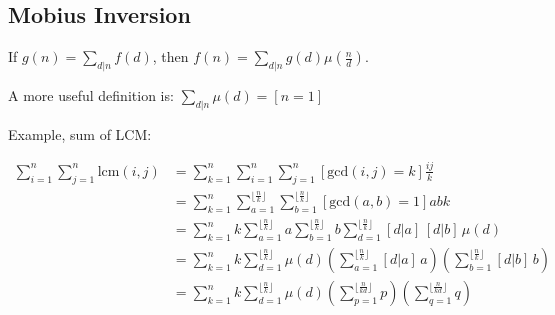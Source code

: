 \subsection{Mobius Inversion}

If $g(n) = \sum_{d|n} f(d)$, then $f(n) = \sum_{d|n} g(d) \mu(\frac{n}{d})$.

A more useful definition is: $\sum_{d|n} \mu(d) = [n = 1]$

Example, sum of LCM:

\begin{align*}
    \sum_{i = 1}^n \sum_{j = 1}^n \text{lcm}(i, j) &=
    \sum_{k = 1}^n\sum_{i=1}^n\sum_{j=1}^n [\text{gcd}(i, j) = k] \frac{ij}{k} \\
    &= \sum_{k = 1}^n\sum_{a=1}^{\lfloor \frac{n}{k} \rfloor}\sum_{b=1}^{\lfloor \frac{n}{k} \rfloor} [\text{gcd}(a, b) = 1] abk \\
    &= \sum_{k = 1}^n k \sum_{a=1}^{\lfloor \frac{n}{k} \rfloor} a \sum_{b=1}^{\lfloor \frac{n}{k} \rfloor} b \sum_{d=1}^{\lfloor \frac{n}{k} \rfloor}[d|a]\,[d|b] \, \mu(d) \\
    &= \sum_{k = 1}^n k \sum_{d=1}^{\lfloor \frac{n}{k} \rfloor}  \mu(d) \left(\sum_{a=1}^{\lfloor \frac{n}{k} \rfloor} [d|a] \, a\right) \left(\sum_{b=1}^{\lfloor \frac{n}{k} \rfloor} [d|b] \, b\right) \\
    &= \sum_{k = 1}^n k \sum_{d=1}^{\lfloor \frac{n}{k} \rfloor}  \mu(d) \left(\sum_{p=1}^{\lfloor \frac{n}{kd} \rfloor} p\right) \left(\sum_{q=1}^{\lfloor \frac{n}{kd} \rfloor} q\right) \\
\end{align*}
